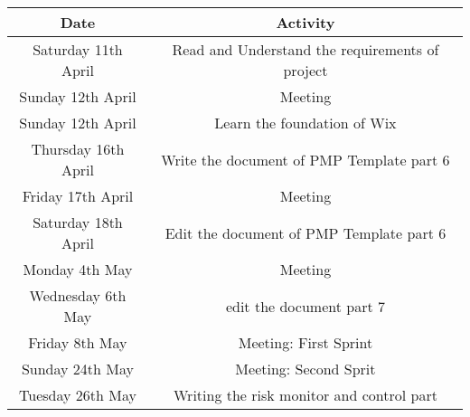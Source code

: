 \begin{tabular}{|c|c|}
\hline
Date & Activity\\
\hline
Saturday 11th April & Read and Understand the requirements of project\\
\hline
Sunday 12th April & Meeting\\
\hline
Sunday 12th April & Learn the foundation of Wix\\
\hline
Thursday 16th April & Write the document of PMP Template part 6\\
\hline
Friday 17th April & Meeting\\
\hline
Saturday 18th April & Edit the document of PMP Template part 6\\
\hline
Monday 4th May & Meeting\\
\hline
Wednesday 6th May & edit the document part 7 \\
\hline
Friday 8th May & Meeting: First Sprint\\
\hline
Sunday 24th May & Meeting: Second Sprit\\
\hline
Tuesday 26th May & Writing the risk monitor and control part\\
\hline
\end{tabular}